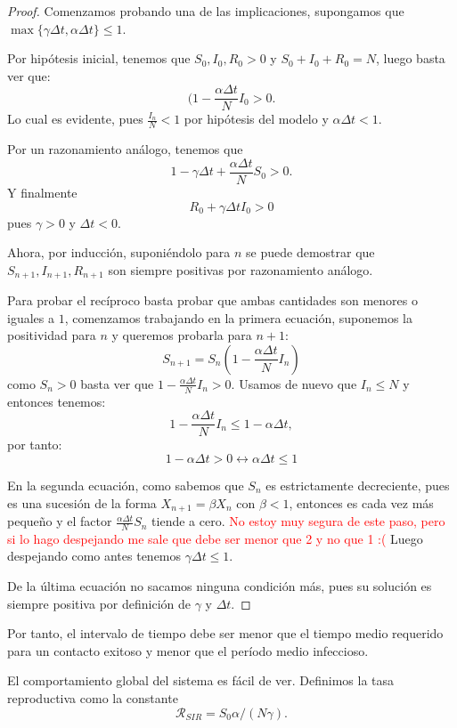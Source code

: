 \begin{proof}
Comenzamos probando una de las implicaciones, supongamos que $\max{\big\{\gamma\Delta t, \alpha\Delta t\big\} } \leq 1$.

Por hipótesis inicial, tenemos que $S_0, I_0, R_0>0$ y $S_0+I_0+R_0=N$, luego basta ver que:
$$(1-\frac{\alpha \Delta t}{N}I_0>0.$$
Lo cual es evidente, pues $\frac{I_n}{N}<1$ por hipótesis del modelo y $\alpha \Delta t<1$.

Por un razonamiento análogo, tenemos que $$1-\gamma \Delta t+\frac{\alpha\Delta t}{N}S_0 > 0.$$
Y finalmente $$R_0+\gamma\Delta t I_0>0$$ pues $\gamma>0$ y $\Delta t <0$.

Ahora, por inducción, suponiéndolo para $n$ se puede demostrar que $S_{n+1}, I_{n+1}, R_{n+1}$ son siempre positivas por razonamiento análogo.

Para probar el recíproco basta probar que ambas cantidades son menores o iguales a $1$, comenzamos trabajando en la primera ecuación, suponemos la positividad para $n$ y queremos probarla para $n+1$:
$$S_{n+1}=S_n\left(1-\frac{\alpha\Delta t}{N}I_n\right)$$
como $S_n>0$ basta ver que $1-\frac{\alpha\Delta t}{N}I_n>0$. Usamos de nuevo que $I_n \leq N$ y entonces tenemos:
$$1-\frac{\alpha\Delta t}{N}I_n \leq 1-\alpha\Delta t,$$
por tanto:
$$1-\alpha\Delta t > 0 \leftrightarrow \alpha\Delta t  \leq 1$$

En la segunda ecuación, como sabemos que $S_n$ es estrictamente decreciente, pues es una sucesión de la forma $X_{n+1}=\beta X_n$ con $\beta < 1$, entonces es cada vez más pequeño y el factor
$\frac{\alpha \Delta t}{N}S_n$ tiende a cero. \textcolor{red}{No estoy muy segura de este paso, pero si lo hago despejando me sale que debe ser menor que 2 y no que 1 :(}
Luego despejando como antes tenemos $\gamma\Delta t \leq 1$.

De la última ecuación no sacamos ninguna condición más, pues su solución es siempre positiva por definición de $\gamma$ y $\Delta t$.

\end{proof}

Por tanto, el intervalo de tiempo debe ser menor que el tiempo medio requerido para un contacto exitoso y menor que el período medio infeccioso.

El comportamiento global del sistema es fácil de ver. Definimos la tasa reproductiva como la constante 
$$\mathcal{R}_{SIR}=S_0 \alpha/(N\gamma ).$$

